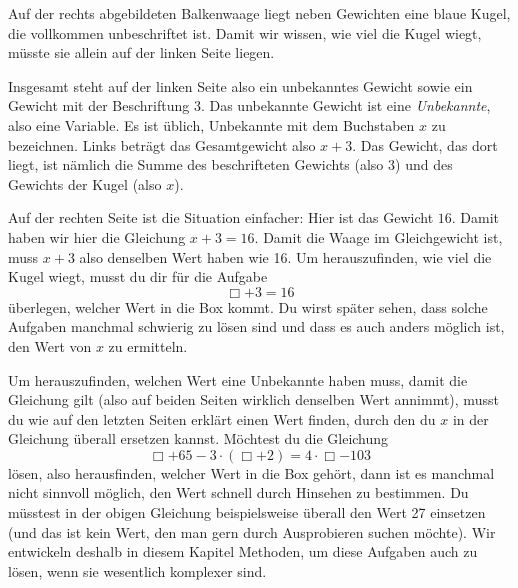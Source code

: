 \documentclass[../../main.tex]{subfiles}
\begin{document}
\begin{example}{}
    
    Auf der rechts abgebildeten Balkenwaage liegt neben Gewichten eine blaue Kugel, die vollkommen unbeschriftet ist. Damit wir wissen, wie viel die Kugel wiegt, müsste sie allein auf der linken Seite liegen.
    
    Insgesamt steht auf der linken Seite also ein unbekanntes Gewicht sowie ein Gewicht mit der Beschriftung 3. Das unbekannte Gewicht ist eine \emph{Unbekannte}, also eine Variable. Es ist üblich, Unbekannte mit dem Buchstaben $x$ zu bezeichnen. Links beträgt das Gesamtgewicht also $x+3$. Das Gewicht, das dort liegt, ist nämlich die Summe des beschrifteten Gewichts (also 3) und des Gewichts der Kugel (also $x$).
    
    Auf der rechten Seite ist die Situation einfacher: Hier ist das Gewicht $16$. Damit haben wir hier die Gleichung $x+3=16$. Damit die Waage im Gleichgewicht ist, muss $x+3$ also denselben Wert haben wie 16. Um herauszufinden, wie viel die Kugel wiegt, musst du dir für die Aufgabe 
    \[\Box+3=16\] 
    überlegen, welcher Wert in die Box kommt. Du wirst später sehen, dass solche Aufgaben manchmal schwierig zu lösen sind und dass es auch anders möglich ist, den Wert von $x$ zu ermitteln.
\end{example}

Um herauszufinden, welchen Wert eine Unbekannte haben muss, damit die Gleichung gilt (also auf beiden Seiten wirklich denselben Wert annimmt), musst du wie auf den letzten Seiten erklärt einen Wert finden, durch den du $x$ in der Gleichung überall ersetzen kannst. Möchtest du die Gleichung
\[\Box+65-3\cdot(\Box+2)=4\cdot \Box-103\]
lösen, also herausfinden, welcher Wert in die Box gehört, dann ist es manchmal nicht sinnvoll möglich, den Wert schnell durch Hinsehen zu bestimmen. Du müsstest in der obigen Gleichung beispielsweise überall den Wert 27 einsetzen (und das ist kein Wert, den man gern durch Ausprobieren suchen möchte). Wir entwickeln deshalb in diesem Kapitel Methoden, um diese Aufgaben auch zu lösen, wenn sie wesentlich komplexer sind.
\end{document}
